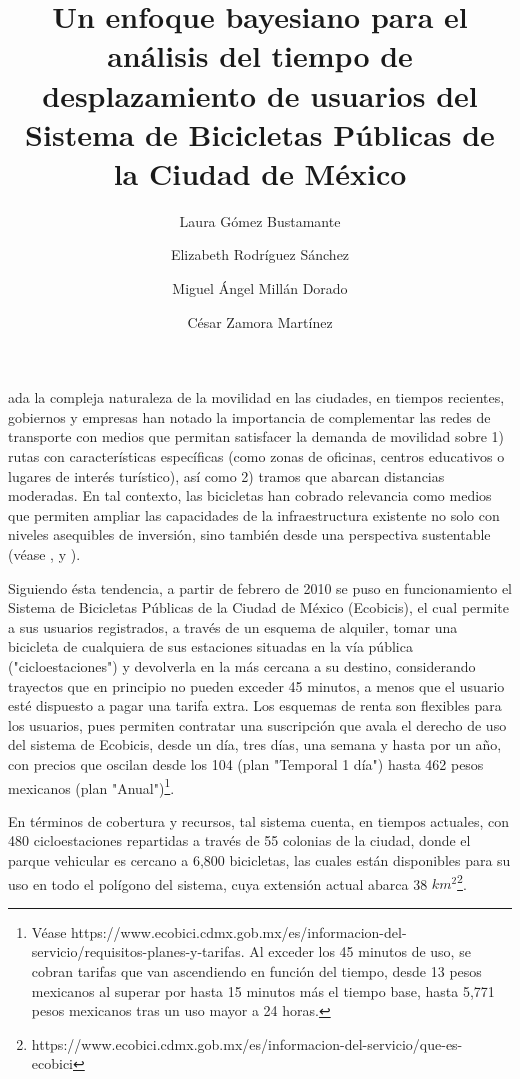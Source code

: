 \documentclass[9pt,twocolumn,twoside]{ilcss}
\title{Un enfoque bayesiano para el análisis del tiempo de desplazamiento de usuarios del Sistema de Bicicletas Públicas de la Ciudad de México}
\author[a]{Laura Gómez Bustamante}
\author[a]{Elizabeth Rodríguez Sánchez}
\author[a]{Miguel Ángel Millán Dorado}
\author[a]{C\'esar Zamora Mart\'inez}
\affil[a]{Alumnos de Maestría en Ciencias de Datos (ITAM)}
\begin{document}
\maketitle
\thispagestyle{firststyle}


ada la compleja naturaleza de la movilidad en las ciudades, en tiempos recientes, gobiernos y empresas han notado la importancia de complementar las redes de transporte con medios que permitan satisfacer la demanda de movilidad sobre 1) rutas con características específicas (como zonas de oficinas, centros educativos o lugares de interés turístico), así como 2) tramos que abarcan distancias moderadas.  En tal contexto, las bicicletas han cobrado relevancia como medios que permiten ampliar las capacidades de la infraestructura existente no solo con niveles asequibles de inversión, sino también desde una perspectiva sustentable (véase \cite{Fishman}, \cite{Pojani} y \cite{Stehlin}).

Siguiendo ésta tendencia, a partir de febrero de 2010 se puso en funcionamiento el Sistema de Bicicletas Públicas de la Ciudad de México (Ecobicis), el cual permite a sus usuarios registrados, a través de un esquema de alquiler, tomar una bicicleta de cualquiera de sus estaciones situadas en la vía pública ("cicloestaciones") y devolverla en la más cercana a su destino,  considerando trayectos que en principio no pueden exceder 45 minutos, a menos que el usuario esté dispuesto a pagar una tarifa extra. Los esquemas de renta son flexibles para los usuarios, pues permiten contratar una suscripción que avala el derecho de uso del sistema de Ecobicis, desde un día, tres días, una semana y hasta por un año, con precios que oscilan desde los 104 (plan "Temporal 1 día") hasta 462 pesos mexicanos (plan "Anual")\footnote{Véase https://www.ecobici.cdmx.gob.mx/es/informacion-del-servicio/requisitos-planes-y-tarifas. Al exceder los 45 minutos de uso, se cobran tarifas que van ascendiendo en función del tiempo, desde 13 pesos mexicanos al superar por hasta 15 minutos más el tiempo base, hasta 5,771 pesos mexicanos tras un uso mayor a 24 horas.}.

En términos de cobertura y recursos, tal sistema cuenta, en tiempos actuales, con 480 cicloestaciones repartidas a través de 55 colonias de la ciudad, donde el parque vehicular es cercano a 6,800 bicicletas, las cuales están disponibles para su uso en todo el polígono del sistema, cuya extensión actual abarca 38 $km^2$\footnote{https://www.ecobici.cdmx.gob.mx/es/informacion-del-servicio/que-es-ecobici}.
\end{document}
